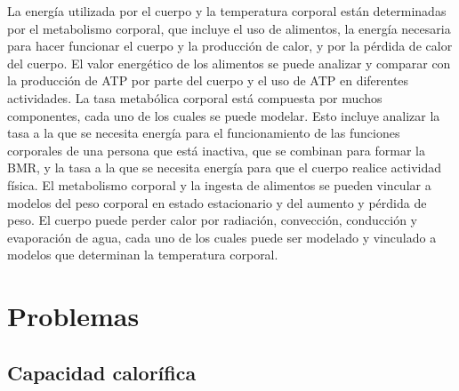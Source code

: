 \documentclass[12pt]{book}
\begin{document}
La energía utilizada por el cuerpo y la temperatura corporal están determinadas por el metabolismo corporal, que incluye el uso de alimentos, la energía necesaria para hacer funcionar el cuerpo y la producción de calor, y por la pérdida de calor del cuerpo. El valor energético de los alimentos se puede analizar y comparar con la producción de ATP por parte del cuerpo y el uso de ATP en diferentes actividades. La tasa metabólica corporal está compuesta por muchos componentes, cada uno de los cuales se puede modelar. Esto incluye analizar la tasa a la que se necesita energía para el funcionamiento de las funciones corporales de una persona que está inactiva, que se combinan para formar la BMR, y la tasa a la que se necesita energía para que el cuerpo realice actividad física. El metabolismo corporal y la ingesta de alimentos se pueden vincular a modelos del peso corporal en estado estacionario y del aumento y pérdida de peso. El cuerpo puede perder calor por radiación, convección, conducción y evaporación de agua, cada uno de los cuales puede ser modelado y vinculado a modelos que determinan la temperatura corporal.

\section*{Problemas}

\subsection*{Capacidad calorífica}
\end{document}

